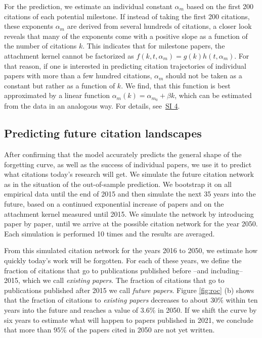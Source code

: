 \documentclass[fleqn,10pt]{wlscirep}
\begin{document}
For the prediction, we estimate an individual constant $\alpha_m$ based on the first 200 citations of each potential milestone. If instead of taking the first 200 citations, these exponents $\alpha_m$ are derived from several hundreds of citations, a closer look reveals that many of the exponents come with a positive slope as a function of the number of citations $k$. This indicates that for milestone papers, the attachment kernel cannot be factorized as $f(k,t, \alpha_m)=g(k) h(t, \alpha_m)$. For that reason, if one is interested in predicting citation trajectories of individual papers with more than a few hundred citations, $\alpha_m$ should not be taken as a constant but rather as a function of $k$. We find, that this function is best approximated by a linear function $\alpha_m(k) = \alpha_{m_{0}} + \beta k$, which can be estimated from the data in an analogous way. For details, see~\hyperref[SI4]{SI 4}.

\subsection*{Predicting future citation landscapes}
After confirming that the model accurately predicts the general shape of the forgetting curve, as well as the success of individual papers, we use it to predict what citations today's research will get. We simulate the future citation network as in the situation of the out-of-sample prediction. We bootstrap it on all empirical data until the end of 2015 and then simulate the next 35 years into the future, based on a continued exponential increase of papers and on the attachment kernel measured until 2015. We simulate the network by introducing paper by paper, until we arrive at the possible citation network for the year 2050. Each simulation is performed 10 times and the results are averaged.

From this simulated citation network for the years 2016 to 2050, we estimate how quickly today's work will be forgotten. For each of these years, we define the fraction of citations that go to publications published before --and including-- 2015, which we call \textit{existing papers}. The fraction of citations that go to publications published after 2015 we call \textit{future papers}. Figure \ref{fig:roc} (b) shows that the fraction of citations to \textit{existing papers} decreases to about $30\%$ within ten years into the future and reaches a value of $3.6\%$ in 2050. If we shift the curve by six years to estimate what will happen to papers published in 2021, we conclude that more than $95\%$ of the papers cited in 2050 are not yet written. 
\end{document}
